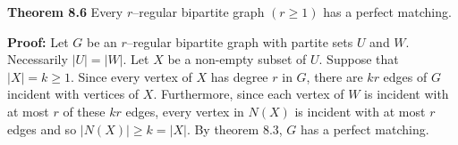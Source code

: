 \nopagenumbers
{\bf Theorem 8.6}
\vskip 6pt
Every $r$--regular bipartite graph $(r \geq 1)$ has a perfect matching.

\vskip 10pt
{\bf Proof:}
\vskip 6pt
Let $G$ be an $r$--regular bipartite graph with partite sets $U$ and $W$. Necessarily $|U|=|W|$. Let $X$ be a non-empty subset of $U$. Suppose that $|X|=k \geq 1$. Since every vertex of $X$ has degree $r$
in $G$, there are $kr$ edges of $G$ incident with vertices of $X$. Furthermore, since each vertex of $W$ is incident with at most $r$ of these $kr$ edges, every vertex in $N(X)$ is incident with at most $r$
edges and so $|N(X)| \geq k=|X|$. By theorem 8.3, $G$ has a perfect matching.

\vfill\eject

